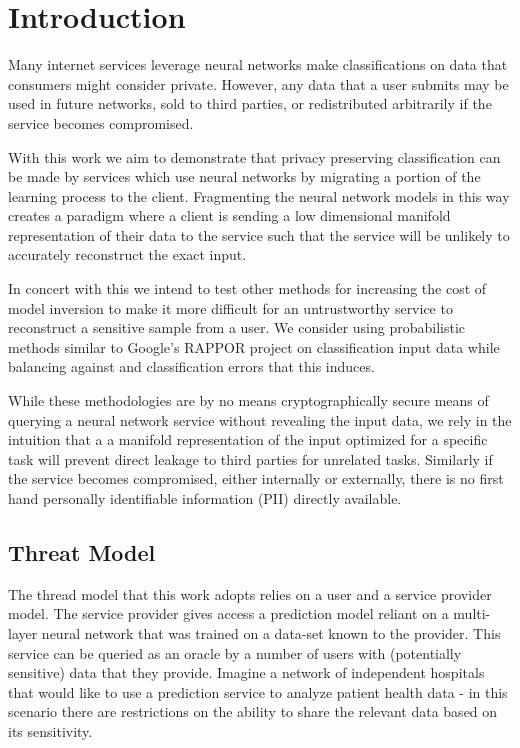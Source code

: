 \section{Introduction}

Many internet services leverage neural networks make classifications on data that consumers
might consider private. However, any data that a user submits may be used in future networks, sold to 
third parties, or redistributed arbitrarily if the service becomes compromised.

With this work we aim to demonstrate that privacy preserving classification can be made by services
which use neural networks by migrating a portion of the learning process to the client. 
Fragmenting the neural network models in this way creates a paradigm where a client is sending 
a low dimensional manifold representation of their data to the service such that the service 
will be unlikely to accurately reconstruct the exact input. 

In concert with this we intend to test other methods for increasing the cost of model
inversion to make it more difficult for an untrustworthy service to reconstruct a
sensitive sample from a user. We consider using probabilistic methods similar to Google's 
RAPPOR project on classification input data while balancing against and classification
errors that this induces. 

While these methodologies are by no means cryptographically secure means of querying a 
neural network service without revealing the input data, we rely in the intuition that a 
a manifold representation of the input optimized for a specific task will prevent direct 
leakage to third parties for unrelated tasks. Similarly if the service becomes compromised, 
either internally or externally, there is no first hand personally identifiable information (PII) 
directly available. 

\subsection{Threat Model}
The thread model that this work adopts relies on a user and a service provider model. The 
service provider gives access a prediction model reliant on a multi-layer neural network 
that was trained on a data-set known to the provider. 
This service can be queried as an oracle by a number of users with (potentially sensitive)
data that they provide. Imagine a network of independent hospitals that would like to use a
prediction service to analyze patient health data - in this scenario there are restrictions
on the ability to share the relevant data based on its sensitivity. 
